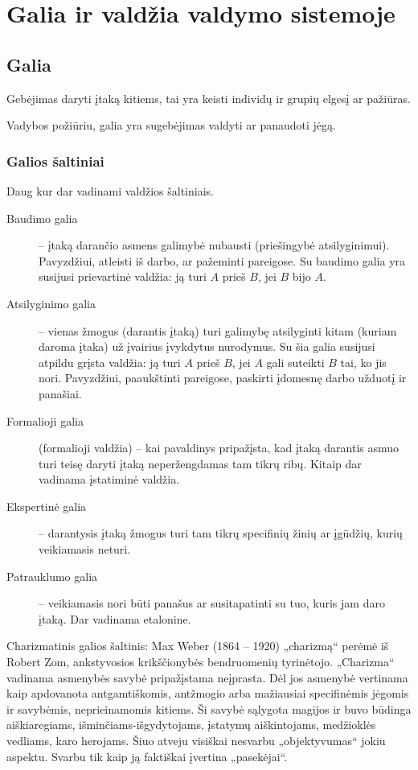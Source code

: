 \chapter{Galia ir valdžia valdymo sistemoje}

\section{Galia}

\begin{defn}[Galia]
  Gebėjimas daryti įtaką kitiems, tai yra keisti individų ir grupių
  elgesį ar pažiūras.
\end{defn}

Vadybos požiūriu, galia yra sugebėjimas valdyti ar panaudoti jėgą.

\subsection{Galios šaltiniai}

Daug kur dar vadinami valdžios šaltiniais.

\begin{description}
  \item[Baudimo galia] – įtaką darančio asmens galimybė nubausti
    (priešingybė atsilyginimui). Pavyzdžiui, atleisti iš darbo,
    ar pažeminti pareigose. Su baudimo galia yra susijusi prievartinė
    valdžia: ją turi $A$ prieš $B$, jei $B$ bijo $A$.
  \item[Atsilyginimo galia] – vienas žmogus (darantis įtaką) turi
    galimybę atsilyginti kitam (kuriam daroma įtaka) už įvairius
    įvykdytus nurodymus. Su šia galia susijusi atpildu grįsta
    valdžia: ją turi $A$ prieš $B$, jei $A$ gali suteikti $B$
    tai, ko jis nori. Pavyzdžiui, paaukštinti pareigose, paskirti
    įdomesnę darbo užduotį ir panašiai.
  \item[Formalioji galia] (formalioji valdžia) – kai pavaldinys
    pripažįsta, kad įtaką darantis asmuo turi teisę daryti įtaką
    neperžengdamas tam tikrų ribų. Kitaip dar vadinama įstatiminė
    valdžia.
  \item[Ekspertinė galia] – darantysis įtaką žmogus turi tam tikrų
    specifinių žinių ar įgūdžių, kurių veikiamasis neturi.
  \item[Patrauklumo galia] – veikiamasis nori būti panašus ar
    susitapatinti su tuo, kuris jam daro įtaką. Dar vadinama
    etalonine.
\end{description}

Charizmatinis galios šaltinis: Max Weber (1864 – 1920) „charizmą“ perėmė
iš Robert Zom, ankstyvosios krikščionybės bendruomenių tyrinėtojo.
„Charizma“ vadinama asmenybės savybė pripažįstama neįprasta.
Dėl jos asmenybė vertinama kaip apdovanota antgamtiškomis, antžmogio
arba mažiausiai specifinėmis jėgomis ir savybėmis, neprieinamomis
kitiems. Ši savybė sąlygota magijos ir buvo būdinga aiškiaregiams,
išminčiams-išgydytojams, įstatymų aiškintojams, medžioklės vedliams,
karo herojams. Šiuo atveju visiškai nesvarbu „objektyvumas“ jokiu
aspektu. Svarbu tik kaip ją faktiškai įvertina „pasekėjai“.

